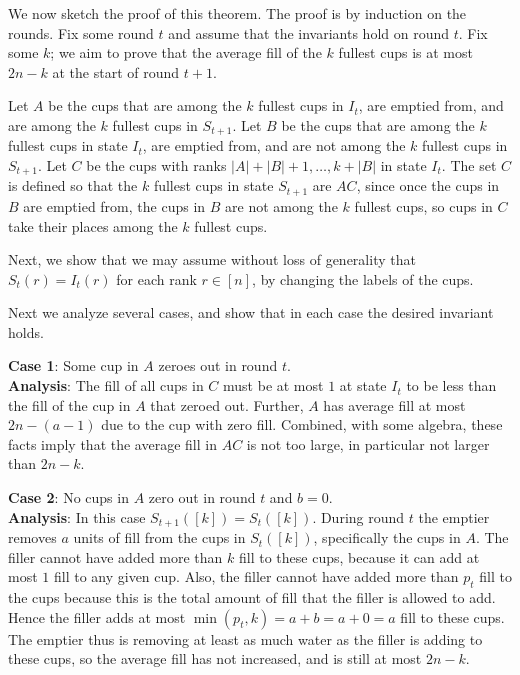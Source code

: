 We now sketch the proof of this theorem. The proof is by
induction on the rounds. Fix some round $t$ and assume that the
invariants hold on round $t$. Fix some $k$; we aim to prove that
the average fill of the $k$ fullest cups is at most $2n-k$ at the
start of round $t+1$. 

Let $A$ be the cups that are among the $k$ fullest cups in $I_t$,
are emptied from, and are among the $k$ fullest cups in
$S_{t+1}$. Let $B$ be the cups that are among the $k$ fullest
cups in state $I_t$, are emptied from, and are not among the $k$
fullest cups in $S_{t+1}$. Let $C$ be the cups with ranks $|A| +
|B| + 1, \ldots, k + |B|$ in state $I_t$. The set $C$ is defined
so that the $k$ fullest cups in state $S_{t+1}$ are $AC$, since
once the cups in $B$ are emptied from, the cups in $B$ are not
among the $k$ fullest cups, so cups in $C$ take their places
among the $k$ fullest cups.

Next, we show that we may assume without loss of
generality that $S_t(r) = I_t(r)$ for each rank $r \in [n]$, by
changing the labels of the cups.

Next we analyze several cases, and show that in each case the
desired invariant holds.

\textbf{Case 1}:
Some cup in $A$ zeroes out in round $t$.\\
\textbf{Analysis}:
The fill of all cups in $C$ must be at most $1$ at state $I_t$ to be
less than the fill of the cup in $A$ that zeroed out. Further,
$A$ has average fill at most $2n-(a-1)$ due to the cup with zero
fill. Combined, with some algebra, these facts imply that the
average fill in $AC$ is not too large, in particular not larger
than $2n-k$.

\textbf{Case 2}:
No cups in $A$ zero out in round $t$ and $b=0$.\\
\textbf{Analysis}:
In this case $S_{t+1}([k]) = S_t([k])$.
During round $t$ the emptier removes $a$ units of fill from the
cups in $S_t([k])$, specifically the cups in $A$. The filler
cannot have added more than $k$ fill to these cups, because it
can add at most $1$ fill to any given cup. Also, the filler
cannot have added more than $p_t$ fill to the cups because this
is the total amount of fill that the filler is allowed to add.
Hence the filler adds at most $\min(p_t, k) = a+b=a+0=a$ fill to
these cups.
The emptier thus is removing at least as much water as the filler
is adding to these cups, so the average fill has not increased,
and is still at most $2n-k$.

